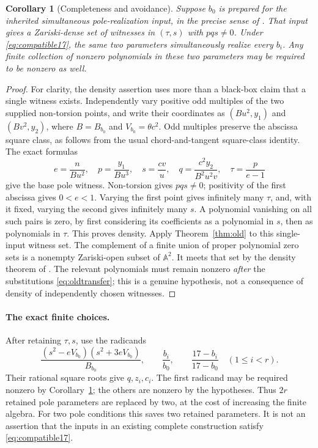 \documentclass[11pt,a4paper]{article}
\newtheorem{corollary}[theorem]{Corollary}
\theoremstyle{definition}\newtheorem{definition}[theorem]{Definition}
\theoremstyle{remark}\newtheorem{remark}[theorem]{Remark}
\newcommand{\A}{\mathbb A}\newcommand{\sqcl}[1]{[#1]}
\begin{document}
\begin{corollary}[Completeness and avoidance]\label{cor:oldcomplete}
Suppose $b_0$ is prepared for the inherited simultaneous pole-realization
input, in the precise sense of \cite{Density}. That input gives a
Zariski-dense set of witnesses in $(\tau,s)$ with $pqs\ne0$.
Under \eqref{eq:compatible17}, the same two parameters simultaneously
realize every $b_i$. Any finite collection of nonzero polynomials in
these two parameters may be required to be nonzero as well.
\end{corollary}
\begin{proof}
For clarity, the density assertion uses more than a black-box claim
that a single witness exists. Independently vary positive odd multiples
of the two supplied non-torsion points, and write their coordinates as
$(B u^2,y_1)$ and $(B v^2,y_2)$, where $B=B_{b_0}$ and
$V_{b_0}=\theta c^2$. Odd multiples preserve the abscissa square class,
as follows from the usual chord-and-tangent square-class identity.
The exact formulas
\[
 e=\frac{n}{Bu^2},\quad p=\frac{y_1}{Bu^3},\quad
 s=\frac{cv}{u},\quad q=\frac{c^2y_2}{B^2u^2v},\quad
 \tau=\frac{p}{e-1}
\]
give the base pole witness. Non-torsion gives $pqs\ne0$; positivity
of the first abscissa gives $0<e<1$. Varying the first point gives
infinitely many $\tau$, and, with it fixed, varying the second gives
infinitely many $s$. A polynomial vanishing on all such pairs is zero,
by first considering its coefficients as a polynomial in $s$, then
as polynomials in $\tau$. This proves density.
Apply Theorem~\ref{thm:old} to this single-input witness set.
The complement of a finite union of proper polynomial zero sets is a
nonempty Zariski-open subset of $\A^2$. It meets that set by the density
theorem of \cite{Density}. The relevant polynomials must remain nonzero
\emph{after} the substitutions \eqref{eq:oldtransfer}; this is a genuine
hypothesis, not a consequence of density of independently chosen
witnesses.
\end{proof}

\paragraph{The exact finite choices.}
After retaining $\tau,s$, use the radicands
\begin{equation}\label{eq:oldradicands}
 \frac{(s^2-eV_{b_0})(s^2+3eV_{b_0})}{B_{b_0}},\qquad
 \frac{b_i}{b_0},\qquad \frac{17-b_i}{17-b_0}\quad(1\le i<r).
\end{equation}
Their rational square roots give $q,z_i,c_i$. The first radicand may
be required nonzero by Corollary~\ref{cor:oldcomplete}; the others are
nonzero by the hypotheses. Thus $2r$ retained pole parameters are
replaced by two, at the cost of increasing the finite algebra.
For two pole conditions this saves two retained parameters. It is not
an assertion that the inputs in an existing complete construction
satisfy \eqref{eq:compatible17}.
\end{document}
